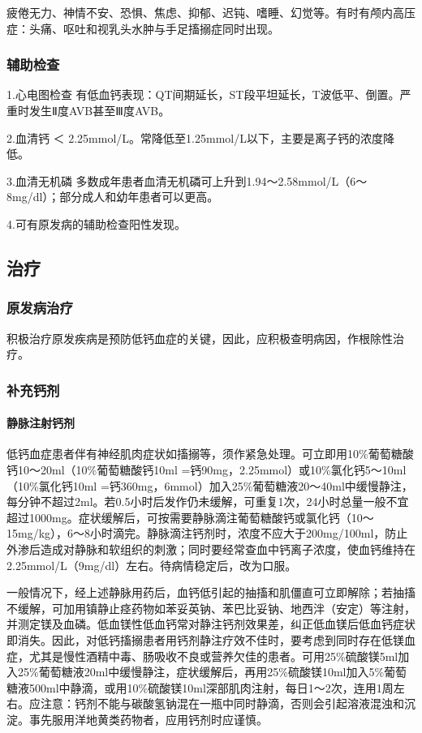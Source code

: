 疲倦无力、神情不安、恐惧、焦虑、抑郁、迟钝、嗜睡、幻觉等。有时有颅内高压症：头痛、呕吐和视乳头水肿与手足搐搦症同时出现。

\subsubsection{辅助检查}

1.心电图检查
有低血钙表现：QT间期延长，ST段平坦延长，T波低平、倒置。严重时发生Ⅱ度AVB甚至Ⅲ度AVB。

2.血清钙 ＜ 2.25mmol/L。常降低至1.25mmol/L以下，主要是离子钙的浓度降低。

3.血清无机磷
多数成年患者血清无机磷可上升到1.94～2.58mmol/L（6～8mg/dl）；部分成人和幼年患者可以更高。

4.可有原发病的辅助检查阳性发现。

\subsection{治疗}

\subsubsection{原发病治疗}

积极治疗原发疾病是预防低钙血症的关键，因此，应积极查明病因，作根除性治疗。

\subsubsection{补充钙剂}

\paragraph{静脉注射钙剂}

低钙血症患者伴有神经肌肉症状如搐搦等，须作紧急处理。可立即用10\%葡萄糖酸钙10～20ml（10\%葡萄糖酸钙10ml
=钙90mg，2.25mmol）或10\%氯化钙5～10ml（10\%氯化钙10ml
=钙360mg，6mmol）加入25\%葡萄糖液20～40ml中缓慢静注，每分钟不超过2ml。若0.5小时后发作仍未缓解，可重复1次，24小时总量一般不宜超过1000mg。症状缓解后，可按需要静脉滴注葡萄糖酸钙或氯化钙（10～15mg/kg），6～8小时滴完。静脉滴注钙剂时，浓度不应大于200mg/100ml，防止外渗后造成对静脉和软组织的刺激；同时要经常查血中钙离子浓度，使血钙维持在2.25mmol/L（9mg/dl）左右。待病情稳定后，改为口服。

一般情况下，经上述静脉用药后，血钙低引起的抽搐和肌僵直可立即解除；若抽搐不缓解，可加用镇静止痉药物如苯妥英钠、苯巴比妥钠、地西泮（安定）等注射，并测定镁及血磷。低血镁性低血钙常对静注钙剂效果差，纠正低血镁后低血钙症状即消失。因此，对低钙搐搦患者用钙剂静注疗效不佳时，要考虑到同时存在低镁血症，尤其是慢性酒精中毒、肠吸收不良或营养欠佳的患者。可用25\%硫酸镁5ml加入25\%葡萄糖液20ml中缓慢静注，症状缓解后，再用25\%硫酸镁10ml加入5\%葡萄糖液500ml中静滴，或用10\%硫酸镁10ml深部肌肉注射，每日1～2次，连用1周左右。应注意：钙剂不能与碳酸氢钠混在一瓶中同时静滴，否则会引起溶液混浊和沉淀。事先服用洋地黄类药物者，应用钙剂时应谨慎。

